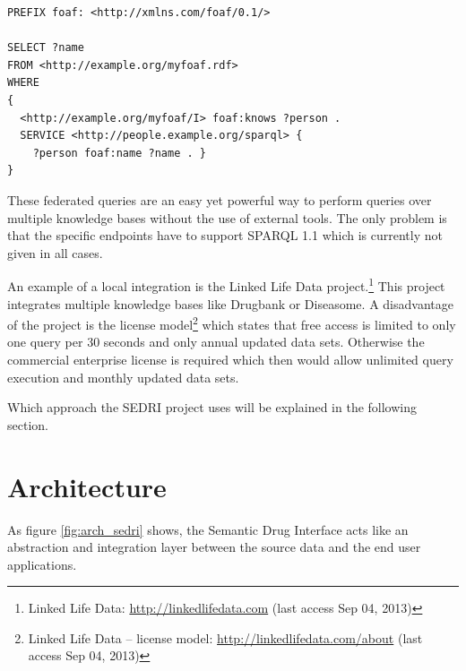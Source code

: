 \lstset{language=sparql}
\begin{lstlisting}[label=lst-fed,numbers=none,caption=Example of SPARQL 1.1 federated query]
PREFIX foaf: <http://xmlns.com/foaf/0.1/>

SELECT ?name
FROM <http://example.org/myfoaf.rdf>
WHERE
{
  <http://example.org/myfoaf/I> foaf:knows ?person .
  SERVICE <http://people.example.org/sparql> { 
    ?person foaf:name ?name . } 
}
\end{lstlisting}

These federated queries are an easy yet powerful way to perform queries over multiple knowledge bases without the use of external tools.
The only problem is that the specific endpoints have to support SPARQL 1.1 which is currently not given in all cases.

An example of a local integration is the Linked Life Data project.\footnote{Linked Life Data: \url{http://linkedlifedata.com} (last access Sep 04, 2013)}
This project integrates multiple knowledge bases like Drugbank or Diseasome.
A disadvantage of the project is the license model\footnote{Linked Life Data -- license model: \url{http://linkedlifedata.com/about} (last access Sep 04, 2013)} which states that free access is limited to only one query per 30 seconds and only annual updated data sets.
Otherwise the commercial enterprise license is required which then would allow unlimited query execution and monthly updated data sets.

Which approach the SEDRI project uses will be explained in the following section.

\section{Architecture}
\label{sec:architecture}

As figure \ref{fig:arch_sedri} shows, the Semantic Drug Interface acts like an abstraction and integration layer between the source data and the end user applications.

